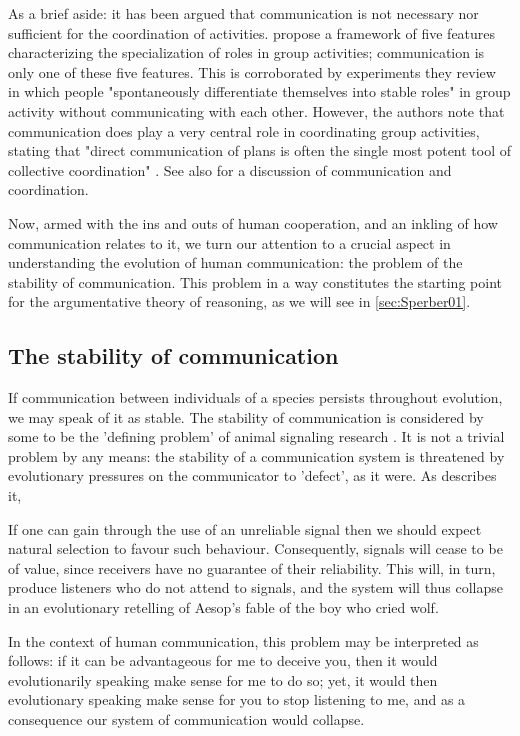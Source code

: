 As a brief aside: it has been argued that communication is not necessary nor sufficient for the coordination of activities. \citet{Goldstone24} propose a framework of five features characterizing the specialization of roles in group activities; communication is only one of these five features. This is corroborated by experiments they review in which people "spontaneously differentiate themselves into stable roles" \citep[p.~264]{Goldstone24} in group activity without communicating with each other.
However, the authors note that communication does play a very central role in coordinating group activities, stating that "direct communication of plans is often the single most potent tool of collective coordination" \citep[p.~276]{Goldstone24}.
See also \citet{Vorobeychik17} for a discussion of communication and coordination.

Now, armed with the ins and outs of human cooperation, and an inkling of how communication relates to it, we turn our attention to a crucial aspect in understanding the evolution of human communication: the problem of the stability of communication.
This problem in a way constitutes the starting point for the argumentative theory of reasoning, as we will see in \cref{sec:Sperber01}.

\subsection{The stability of communication}
\label{sec:S-P08}

If communication between individuals of a species persists throughout evolution, we may speak of it as stable. The stability of communication is considered by some to be the 'defining problem' of animal signaling research \citep{Scott-Phillips08}. It is not a trivial problem by any means: the stability of a communication system is threatened by evolutionary pressures on the communicator to 'defect', as it were. As \citet{Scott-Phillips08} describes it,
\begin{quoting}
    If one can gain through the use of an unreliable signal then we should expect natural selection to favour such behaviour. Consequently, signals will cease to be of value, since receivers have no guarantee of their reliability. This will, in turn, produce listeners who do not attend to signals, and the system will thus collapse in an evolutionary retelling of Aesop’s fable of the boy who cried wolf.
\end{quoting}
In the context of human communication, this problem may be interpreted as follows: if it can be advantageous for me to deceive you, then it would evolutionarily speaking make sense for me to do so; yet, it would then evolutionary speaking make sense for you to stop listening to me, and as a consequence our system of communication would collapse.

